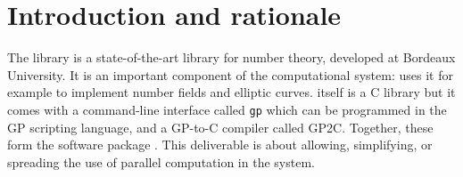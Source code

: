 \documentclass{deliverablereport}
\author{Bill Allombert, Karim Belabas}
\begin{document}
\maketitle
\githubissuedescription
\tableofcontents

\section{Introduction and rationale}

The \Pari library is a state-of-the-art library for number theory,
developed at Bordeaux University. It is an important component of the \Sage
computational system: \Sage uses it for example to implement number fields
and elliptic curves. \Pari itself is a C library but it comes with a
command-line interface called \texttt{gp} which can be programmed in the GP
scripting language, and a GP-to-C compiler called GP2C. Together, these form
the software package \PariGP. This deliverable is about allowing,
simplifying, or spreading the use of parallel computation in the system.
\end{document}
